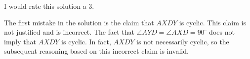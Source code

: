I would rate this solution a 3.

The first mistake in the solution is the claim that $AXDY$ is cyclic. This claim is not justified and is incorrect. The fact that $\angle AYD = \angle AXD = 90^\circ$ does not imply that $AXDY$ is cyclic. In fact, $AXDY$ is not necessarily cyclic, so the subsequent reasoning based on this incorrect claim is invalid.
